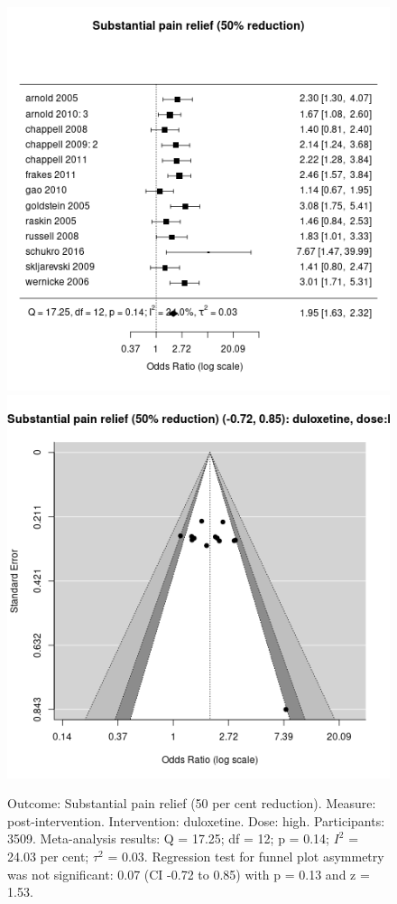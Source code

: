 \documentclass{report}\usepackage[]{graphicx}\usepackage[]{color}
\newenvironment{knitrout}{}{} %
\begin{document}
\begin{figure}

\begin{knitrout}
\color{fgcolor}
\includegraphics[width=0.5\linewidth,height=0.35\textheight]{img/pain_sub-duloxetine-dose-high-forest} 
\includegraphics[width=0.5\linewidth,height=0.35\textheight]{img/pain_sub-duloxetine-dose-high-funnel} 
\end{knitrout}

\caption[Substantial pain: duloxetine, high dose]{Outcome: Substantial pain relief  (50 per cent reduction). Measure: post-intervention. Intervention: duloxetine. Dose: high. Participants: 3509. Meta-analysis results: Q = 17.25; df = 12; p = 0.14; $I^2$ = 24.03 per cent; $\tau^2$ = 0.03. Regression test for funnel plot asymmetry was not significant: 0.07 (CI -0.72 to 0.85) with p = 0.13 and z = 1.53.
}
\label{fig:subpain-highdose-dulox}
\end{figure}
\end{document}
